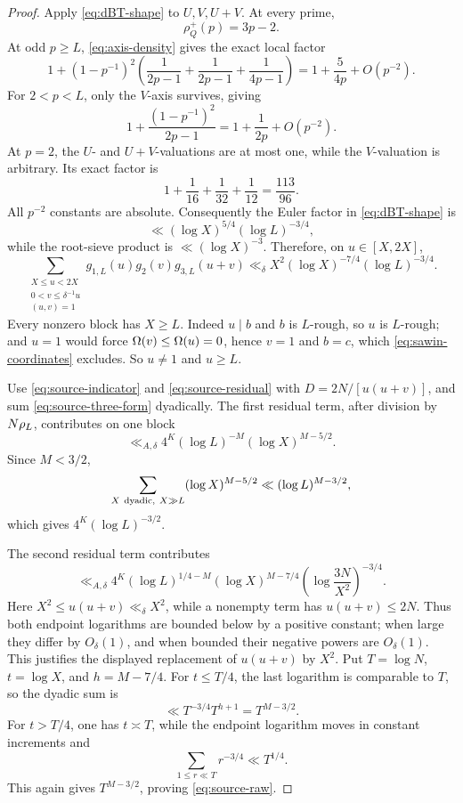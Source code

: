 \documentclass[11pt]{article}
\begin{document}
\begin{proof}
Apply \eqref{eq:dBT-shape} to \(U,V,U+V\). At every prime,
\[
 \rho_Q^+(p)=3p-2.
\]
At odd \(p\geq L\), \eqref{eq:axis-density} gives the exact local factor
\[
 1+(1-p^{-1})^2
 \left(\frac1{2p-1}+\frac1{2p-1}+\frac1{4p-1}\right)
 =1+\frac{5}{4p}+O(p^{-2}).
\]
For \(2<p<L\), only the \(V\)-axis survives, giving
\[
 1+\frac{(1-p^{-1})^2}{2p-1}
 =1+\frac1{2p}+O(p^{-2}).
\]
At \(p=2\), the \(U\)- and \(U+V\)-valuations are at most one, while the
\(V\)-valuation is arbitrary. Its exact factor is
\[
 1+\frac1{16}+\frac1{32}+\frac1{12}
 =\frac{113}{96}.
\]
All \(p^{-2}\) constants are absolute. Consequently the Euler factor in
\eqref{eq:dBT-shape} is
\[
 \ll(\log X)^{5/4}(\log L)^{-3/4},
\]
while the root-sieve product is \(\ll(\log X)^{-3}\). Therefore, on
\(u\in[X,2X]\),
\begin{equation}\label{eq:source-three-form}
 \sum_{\substack{X\leq u<2X\\0<v\leq\delta^{-1}u\\(u,v)=1}}
 g_{1,L}(u)g_2(v)g_{3,L}(u+v)
 \ll_\delta
 X^2(\log X)^{-7/4}(\log L)^{-3/4}.
\end{equation}
Every nonzero block has \(X\geq L\). Indeed \(u\mid b\) and \(b\) is
\(L\)-rough, so \(u\) is \(L\)-rough; and \(u=1\) would force
\(\Omega(v)\leq\Omega(u)=0\), hence \(v=1\) and \(b=c\), which
\eqref{eq:sawin-coordinates} excludes. So \(u\neq1\) and \(u\geq L\).

Use \eqref{eq:source-indicator} and
\eqref{eq:source-residual} with
\(D=2N/[u(u+v)]\), and sum \eqref{eq:source-three-form} dyadically. The first
residual term, after division by \(N\rho_L\), contributes on one block
\[
 \ll_{A,\delta}
 4^K(\log L)^{-M}(\log X)^{M-5/2}.
\]
Since \(M<3/2\),
\[
 \sum_{X\ {\rm dyadic},\ X\gg L}
 (\log X)^{M-5/2}
 \ll(\log L)^{M-3/2},
\]
which gives \(4^K(\log L)^{-3/2}\).

The second residual term contributes
\[
 \ll_{A,\delta}
 4^K(\log L)^{1/4-M}
 (\log X)^{M-7/4}
 \left(\log\frac{3N}{X^2}\right)^{-3/4}.
\]
Here \(X^2\leq u(u+v)\ll_\delta X^2\), while a nonempty term has
\(u(u+v)\leq2N\). Thus both endpoint logarithms are bounded below by a
positive constant; when large they differ by \(O_\delta(1)\), and when
bounded their negative powers are \(O_\delta(1)\). This justifies the
displayed replacement of \(u(u+v)\) by \(X^2\).
Put \(T=\log N\), \(t=\log X\), and \(h=M-7/4\). For \(t\leq T/4\), the
last logarithm is comparable to \(T\), so the dyadic sum is
\[
 \ll T^{-3/4}T^{h+1}=T^{M-3/2}.
\]
For \(t>T/4\), one has \(t\asymp T\), while the endpoint logarithm moves in
constant increments and
\[
 \sum_{1\leq r\ll T}r^{-3/4}\ll T^{1/4}.
\]
This again gives \(T^{M-3/2}\), proving \eqref{eq:source-raw}.
\end{proof}
\end{document}
